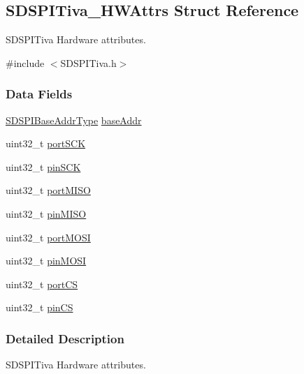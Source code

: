 \subsection{S\+D\+S\+P\+I\+Tiva\+\_\+\+H\+W\+Attrs Struct Reference}
\label{struct_s_d_s_p_i_tiva___h_w_attrs}


S\+D\+S\+P\+I\+Tiva Hardware attributes.  




{\ttfamily \#include $<$S\+D\+S\+P\+I\+Tiva.\+h$>$}

\subsubsection*{Data Fields}
\begin{DoxyCompactItemize}
\item 
\hyperlink{_s_d_s_p_i_c_c3200_8h_ad2ee2f6fbdb79c0577161ae92a7f1650}{S\+D\+S\+P\+I\+Base\+Addr\+Type} \hyperlink{struct_s_d_s_p_i_tiva___h_w_attrs_a4e51479529ad50f9ecb38b73b7f12178}{base\+Addr}
\item 
uint32\+\_\+t \hyperlink{struct_s_d_s_p_i_tiva___h_w_attrs_ada428b116f5c2ff434bc8b42fe3fce67}{port\+S\+C\+K}
\item 
uint32\+\_\+t \hyperlink{struct_s_d_s_p_i_tiva___h_w_attrs_a669a419841ff7c5ba81778ed94488f25}{pin\+S\+C\+K}
\item 
uint32\+\_\+t \hyperlink{struct_s_d_s_p_i_tiva___h_w_attrs_a5586b260f63484ba6a17e17df3b55cd8}{port\+M\+I\+S\+O}
\item 
uint32\+\_\+t \hyperlink{struct_s_d_s_p_i_tiva___h_w_attrs_a4f9e453efc436b6085d60958c4e35621}{pin\+M\+I\+S\+O}
\item 
uint32\+\_\+t \hyperlink{struct_s_d_s_p_i_tiva___h_w_attrs_ab3777b1b021adab95b084a184c52190c}{port\+M\+O\+S\+I}
\item 
uint32\+\_\+t \hyperlink{struct_s_d_s_p_i_tiva___h_w_attrs_a9cd1616a8428a2a12986a77d43b74870}{pin\+M\+O\+S\+I}
\item 
uint32\+\_\+t \hyperlink{struct_s_d_s_p_i_tiva___h_w_attrs_a280c343673240705674b67fd32c4affc}{port\+C\+S}
\item 
uint32\+\_\+t \hyperlink{struct_s_d_s_p_i_tiva___h_w_attrs_a50cd7f2bd849a73e055283d3a302f3fe}{pin\+C\+S}
\end{DoxyCompactItemize}


\subsubsection{Detailed Description}
S\+D\+S\+P\+I\+Tiva Hardware attributes. 

